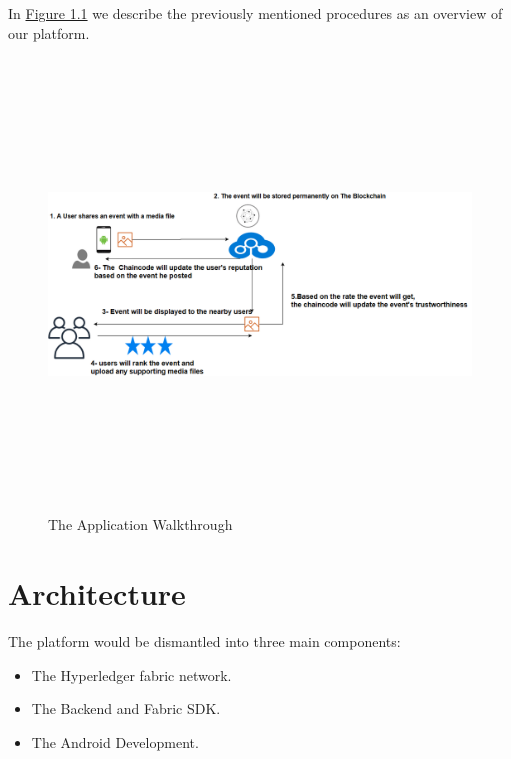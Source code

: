\cleardoublepage
\noindent In \hyperref[fig:appflow]{Figure 1.1} we describe the previously mentioned procedures as an overview of our platform.
	\begin{figure}[H]
	\includegraphics[width=15cm,height=12cm]{images/appflow.png}
	\caption{The Application Walkthrough}
	\label{fig:appflow}
	\end{figure}

\section{Architecture}
The platform would be dismantled into three main components: 
\begin{itemize}
  \item The Hyperledger fabric network.
  \item The Backend and Fabric SDK. 
  \item The Android Development. 
\end{itemize}

\cleardoublepage

